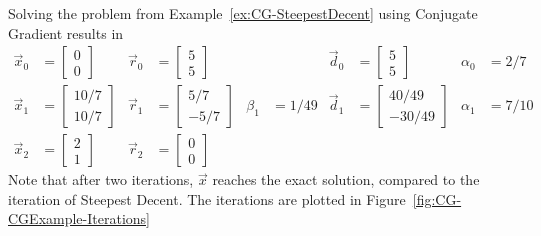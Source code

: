 \begin{example}
\label{ex:CG-CG}
Solving the problem from Example~\ref{ex:CG-SteepestDecent} using Conjugate Gradient results in
\begin{align*}
	\vec{x}_0 &= \begin{bmatrix}0\\0\end{bmatrix}
	&\vec{r}_0 &= \begin{bmatrix}5\\5\end{bmatrix}
	& &
	& \vec{d}_0 &= \begin{bmatrix}5\\5\end{bmatrix}
	&\alpha_0 &= 2/7 \\
	\vec{x}_1 &= \begin{bmatrix}10/7\\10/7\end{bmatrix}
	&\vec{r}_1 &= \begin{bmatrix}5/7\\-5/7\end{bmatrix}
	&\beta_1 &= 1/49
	&\vec{d}_1 &= \begin{bmatrix}40/49\\-30/49\end{bmatrix}
	&\alpha_1 &= 7/10 \\
	\vec{x}_2 &= \begin{bmatrix}2\\1\end{bmatrix}
	&\vec{r}_2 &= \begin{bmatrix}0\\0\end{bmatrix}
\end{align*}
Note that after two iterations, \(\vec{x}\) reaches the exact solution, compared to the iteration of Steepest Decent.
The iterations are plotted in Figure~\ref{fig:CG-CGExample-Iterations}

\end{example}